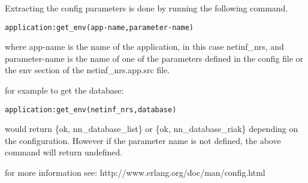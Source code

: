 Extracting the config parameters is done by running the following command.

\begin {verbatim}
application:get_env(app-name,parameter-name) 
\end{verbatim}

where app-name is the name of the application, in this case netinf\_nrs, and parameter-name is the name of one of the parameters defined in the config file or the env section of the netinf\_nrs.app.src file.

for example to get the database:

\begin {verbatim}
application:get_env(netinf_nrs,database) 
\end{verbatim}

would return \{ok, nn\_database\_list\} or \{ok, nn\_database\_riak\} depending on the configuration. However if the parameter name is not defined, the above command will return undefined.

for more information see: http://www.erlang.org/doc/man/config.html
